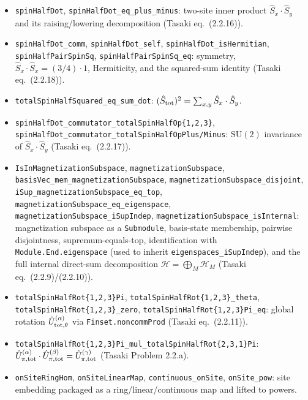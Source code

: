 \documentclass[a4paper,11pt]{article}
\begin{document}
\begin{itemize}
  \texttt{totalSpinHalfOpPlus/Minus\_mulVec\_basisVec}: raising and
  lowering action on basis states.
\item \texttt{spinHalfDot}, \texttt{spinHalfDot\_eq\_plus\_minus}:
  two-site inner product $\hat S_x \cdot \hat S_y$ and its
  raising/lowering decomposition (Tasaki eq.~(2.2.16)).
\item \texttt{spinHalfDot\_comm}, \texttt{spinHalfDot\_self},
  \texttt{spinHalfDot\_isHermitian},
  \texttt{spinHalfPairSpinSq}, \texttt{spinHalfPairSpinSq\_eq}:
  symmetry, $\hat S_x \cdot \hat S_x = (3/4)\cdot 1$, Hermiticity, and
  the squared-sum identity (Tasaki eq.~(2.2.18)).
\item \texttt{totalSpinHalfSquared\_eq\_sum\_dot}:
  $(\hat S_{\rm tot})^2 = \sum_{x,y} \hat S_x \cdot \hat S_y$.
\item \texttt{spinHalfDot\_commutator\_totalSpinHalfOp\{1,2,3\}},
  \texttt{spinHalfDot\_commutator\_totalSpinHalfOpPlus/Minus}:
  $\mathrm{SU}(2)$ invariance of $\hat S_x \cdot \hat S_y$
  (Tasaki eq.~(2.2.17)).
\item \texttt{IsInMagnetizationSubspace},
  \texttt{magnetizationSubspace}, \texttt{basisVec\_mem\_magnetizationSubspace},
  \texttt{magnetizationSubspace\_disjoint},
  \texttt{iSup\_magnetizationSubspace\_eq\_top},
  \texttt{magnetizationSubspace\_eq\_eigenspace},
  \texttt{magnetizationSubspace\_iSupIndep},
  \texttt{magnetizationSubspace\_isInternal}:
  magnetization subspace as a \texttt{Submodule}, basis-state
  membership, pairwise disjointness, supremum-equals-top, identification
  with \texttt{Module.End.eigenspace} (used to inherit
  \texttt{eigenspaces\_iSupIndep}), and the full internal direct-sum
  decomposition $\mathcal H = \bigoplus_M \mathcal H_M$
  (Tasaki eq.~(2.2.9)/(2.2.10)).
\item \texttt{totalSpinHalfRot\{1,2,3\}Pi},
  \texttt{totalSpinHalfRot\{1,2,3\}\_theta},
  \texttt{totalSpinHalfRot\{1,2,3\}\_zero},
  \texttt{totalSpinHalfRot\{1,2,3\}Pi\_eq}: global rotation
  $\hat U^{(\alpha)}_{\rm tot,\theta}$ via \texttt{Finset.noncommProd}
  (Tasaki eq.~(2.2.11)).
\item \texttt{totalSpinHalfRot\{1,2,3\}Pi\_mul\_totalSpinHalfRot\{2,3,1\}Pi}:
  $\hat U^{(\alpha)}_{\pi,{\rm tot}} \cdot
   \hat U^{(\beta)}_{\pi,{\rm tot}}
   = \hat U^{(\gamma)}_{\pi,{\rm tot}}$ (Tasaki Problem 2.2.a).
\item \texttt{onSiteRingHom}, \texttt{onSiteLinearMap},
  \texttt{continuous\_onSite}, \texttt{onSite\_pow}: site embedding
  packaged as a ring/linear/continuous map and lifted to powers.

\end{itemize}
\end{document}
